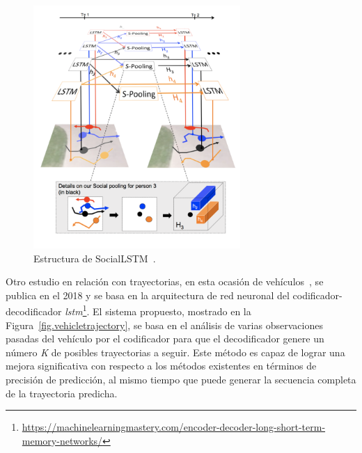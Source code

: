 \vspace{10pt}
\begin{figure}[H]
	\begin{center}
		\includegraphics[width=0.7\textwidth]{ figures/estadoarte/sociallstm.png}
		\caption{Estructura de SocialLSTM~\cite{sociallstm}.
		}
		\label{fig.socialstm}
	\end{center}
\end{figure}
\vspace{-10pt}



Otro estudio en relación con trayectorias, en esta ocasión de vehículos~\cite{vehicletrajectory}, se publica en el 2018 y se basa en la arquitectura de red neuronal del codificador-decodificador \textit{lstm}\footnote{\url{https://machinelearningmastery.com/encoder-decoder-long-short-term-memory-networks/}}. El sistema propuesto, mostrado en la Figura~\ref{fig.vehicletrajectory}, se basa en el análisis de varias observaciones pasadas del vehículo por el codificador para que el decodificador genere un número \textit{K} de posibles trayectorias a seguir. Este método es capaz de lograr una mejora significativa con respecto a los métodos existentes en términos de precisión de predicción, al mismo tiempo que puede generar la secuencia completa de la trayectoria predicha.

